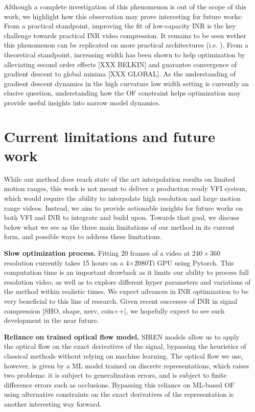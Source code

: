 \documentclass{article}
\begin{document}
Although a complete investigation of this phenomenon is out of the scope of this work,
we highlight how this observation may prove interesting for future works:
From a practical standpoint, improving the fit of low-capacity INR
is the key challenge towards practical INR video compression.
It remains to be seen wether this phenomenon can be replicated on more practical architectures (i.e. \cite{chen2021nerv}).
From a theoretical standpoint, increasing width has been shown to help
optimization by alleviating second order effects [XXX BELKIN]
and guarantee convergence of gradient descent to global minima [XXX GLOBAL].
As the understanding of gradient descent dynamics in the high curvature low width setting
is currently an elusive question, understanding how the OF constraint
helps optimization may provide useful insights into narrow model dynamics.

\section{Current limitations and future work}
\label{sec_lim}

While our method does reach state of the art interpolation results on limited motion ranges,
this work is not meant to deliver a production ready VFI system,
which would require the ability to interpolate high resolution and large motion range videos.
Instead, we aim to provide actionable insights for future works on both VFI and INR to integrate and build upon.
Towards that goal, we discuss below what we see as the three main limitations of our method in its current form,
and possible ways to address these limitations.

\textbf{Slow optimization process.}
Fitting 20 frames of a video at $240 \times 360$ resolution currently takes 15 hours on a 4$\times$2080Ti GPU using Pytorch.
This computation time is an important drawback as it limits our ability to process full resolution video,
as well as to explore different hyper parameters and variations of the method within realistic times.
We expect advances in INR optimization to be very beneficial to this line of research.
Given recent successes of INR in signal compression [SHO, shape, nerv, coin++],
we hopefully expect to see such development in the near future.

\textbf{Reliance on trained optical flow model.}
SIREN models allow us to apply the optical flow on the exact derivatives of the signal,
bypassing the heuristics of classical methods without relying on machine learning.
The optical flow we use, however, is given by a ML model trained on discrete representations, which raises two problems:
it is subject to generalization errors,
and is subject to finite difference errors such as occlusions.
Bypassing this reliance on ML-based OF using alternative constraints on the exact derivatives
of the representation is another interesting way forward.
\end{document}
